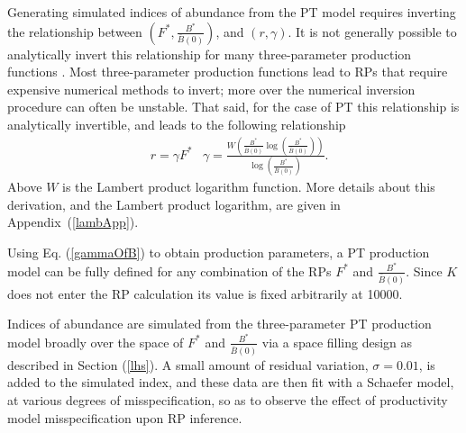 Generating simulated indices of abundance from the PT model requires
inverting the relationship between $\left(F^*, \frac{B^*}{\bar B(0)}\right)$, and
$(r, \gamma)$. It is not generally possible to analytically invert this
relationship for many three-parameter production functions \cite{punt_extending_2019, schnute_analytical_1998}. %
Most three-parameter production functions lead to RPs that require expensive
numerical methods to invert; more over the numerical inversion procedure can %
often be unstable. That said, for the case of PT this relationship is
analytically invertible, and leads to the following relationship
%
\begin{align}
&r = \gamma F^*
&\gamma = \frac{W\left(\frac{B^*}{\bar B(0)}\log\left(\frac{B^*}{\bar B(0)}\right)\right)}{\log\left(\frac{B^*}{\bar B(0)}\right)}. \label{gammaOfB}
\end{align}
%
Above $W$ is the Lambert product logarithm function. More details about this
derivation, and the Lambert product logarithm, are given in \mbox{Appendix (\ref{lambApp}).}

%
Using Eq. (\ref{gammaOfB}) to obtain production parameters, a PT production model
can be fully defined for any combination of the RPs $F^*$ and $\frac{B^*}{\bar B(0)}$.
Since $K$ does not enter the RP calculation its value is fixed arbitrarily at 10000.

%
%


%

Indices of abundance are simulated from the three-parameter PT production model
broadly over the space of $F^*$ and $\frac{B^*}{\bar B(0)}$ via a space filling
design as described in Section (\ref{lhs}). A small amount of residual variation,
$\sigma=0.01$, is added to the simulated index, and these data are then fit with a
Schaefer model, at various degrees of misspecification, so as to observe the
effect of productivity model misspecification upon RP inference.

